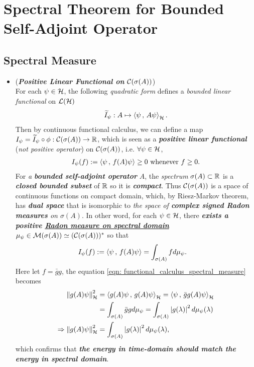 \documentclass[11pt]{article}
\begin{document}
\section{Spectral Theorem for Bounded Self-Adjoint Operator}
\subsection{Spectral Measure}
\begin{itemize}
\item \begin{remark} (\emph{\textbf{Positive Linear Functional on ${\mathcal C}(\sigma(A))$}})\\
For each $\psi \in {\mathcal H}$, the following \emph{quadratic form} defines a \emph{bounded linear functional} on ${\mathcal L}({\mathcal H})$
\begin{align*}
\widetilde{I}_{\psi}: A \mapsto \left\langle \psi\,,\, A \psi \right\rangle_{{\mathcal H}}.
\end{align*} Then by continuous functional calculus, we can define a map $I_{\psi} =\widetilde{I}_{\psi} \circ \phi: {\mathcal C}(\sigma(A)) \rightarrow  {\mathbb R}$, which is seen as a \emph{\textbf{positive linear functional}} (\emph{not positive operator}) on ${\mathcal C}(\sigma(A))$, i.e.  $\forall \psi \in {\mathcal H}$,
\begin{align*}
I_{\psi}(f) := \left\langle \psi\,,\, f(A)\psi \right\rangle \ge 0 \text{ whenever }f\ge 0.
\end{align*}
For \emph{a \textbf{bounded self-adjoint operator}} $A$, the \emph{spectrum} $\sigma(A) \subset {\mathbb R}$ is a \emph{\textbf{closed bounded subset}} of ${\mathbb R}$ so it is \emph{\textbf{compact}}. Thus ${\mathcal C}(\sigma(A))$ is a space of continuous functions on compact domain, which, by Riesz-Markov theorem, has \emph{\textbf{dual space}} that is isomorphic to \emph{the space of \textbf{complex signed Radon measures} on $\sigma(A)$}. In other word, for each $\psi \in {\mathcal H}$, there \emph{\textbf{exists a positive \underline{Radon measure on spectral domain}}} $\mu_{\psi} \in {\mathcal M}(\sigma(A)) \simeq ({\mathcal C}(\sigma(A)))^{*}$ so that 
\begin{align}
I_{\psi}(f) := \left\langle \psi\,,\, f(A)\psi \right\rangle &= \int_{\sigma(A)} f d\mu_{\psi}. \label{eqn: functional_calculus_spectral_measure}
\end{align}
Here  let $f = \bar{g}g$, the equation \eqref{eqn: functional_calculus_spectral_measure} becomes
\begin{align}
\left\|g(A)\psi\right\|_{{\mathcal H}}^2 &= \left\langle g(A)\psi\,,\, g(A)\psi \right\rangle_{{\mathcal H}} = \left\langle \psi\,,\, \bar{g}g(A)\psi \right\rangle_{{\mathcal H}}  \nonumber\\
&= \int_{\sigma(A)} \bar{g}g d\mu_{\psi} = \int_{\sigma(A)} \left\lvert g(\lambda) \right\rvert^2 d\mu_{\psi}(\lambda) \nonumber\\
\Rightarrow \left\|g(A)\psi\right\|_{{\mathcal H}}^2 &= \int_{\sigma(A)} \left\lvert g(\lambda) \right\rvert^2 d\mu_{\psi}(\lambda),  \label{eqn: time_specturm_energy_preserve}
\end{align}
 which confirms that \emph{\textbf{the energy in time-domain should match the energy in spectral domain}}.
\end{remark}


\end{itemize}
\end{document}
